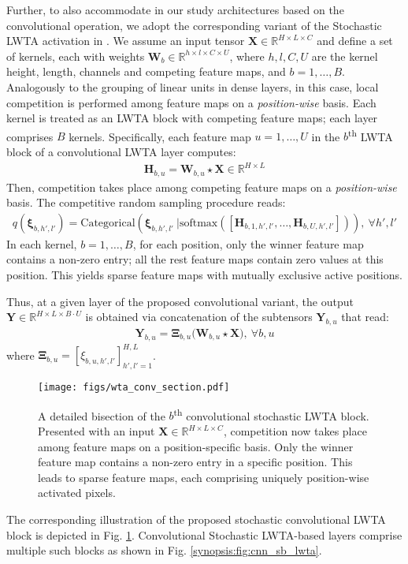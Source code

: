 \documentclass{article}
\begin{document}
	Further, to also accommodate in our study architectures based on the convolutional operation, we adopt the corresponding variant of the Stochastic LWTA activation in \cite{panousis2019nonparametric}.  We assume an input tensor $\boldsymbol{X} \in \mathbb{R}^{H\times L \times C}$ and define a set of kernels, each with weights  $\boldsymbol{W}_b\in \mathbb{R}^{h\times l \times C\times U}$, where $h, l, C, U$ are the kernel height, length, channels and competing feature maps, and $b=1, \dots, B$. Analogously to the grouping of linear units in dense layers, in this case, local competition is performed among feature maps on a \emph{position-wise} basis. Each kernel is treated as an LWTA block with competing feature maps; each layer comprises $B$ kernels. Specifically, each feature map $u=1, \dots, U$ in the $b$\textsuperscript{th} LWTA block of a convolutional LWTA layer computes:
\begin{align}
	   \boldsymbol H_{b,u} = \boldsymbol W_{b,u} \star \boldsymbol X \in \mathbb{R}^{H \times L} 
    \end{align}
Then, competition takes place among competing feature maps on a \textit{position-wise} basis. The competitive random sampling procedure reads:
\begin{align}
    	q(\boldsymbol\xi_{b,h',l'}) = \mathrm{Categorical}\left( \boldsymbol\xi_{b,h',l'} \ \Big|\mathrm{softmax}\left(\left[ \boldsymbol H_{b,1,h',l'}, \dots, \boldsymbol H_{b,U, h',l'} \right]\right)\right), \ \forall h',l'
    	\label{eqn:conv_q_xi}
    \end{align}
In each kernel, $b=1,\dots,B$, for each position, only the winner feature map contains a non-zero entry; all the rest feature maps contain zero values at this position. This yields sparse feature maps with mutually exclusive active positions. 
	
	Thus, at a given layer of the proposed convolutional variant, the output $\boldsymbol Y \in \mathbb{R}^{H \times L \times B \cdot U}$ is obtained via concatenation of the subtensors $\boldsymbol{Y}_{b,u}$ that read:
	\begin{align}
		\boldsymbol{Y}_{b,u} = \boldsymbol{\Xi}_{b,u} \Big( \boldsymbol{W}_{b, u}  \star \boldsymbol{X}\Big), \ \forall b,u
	\end{align}
	where $\boldsymbol{\Xi}_{b,u} = [\xi_{b,u,h',l'}]_{h',l'=1}^{H,L}$.
\begin{figure}
		\centering
		\texttt{[image: figs/wta\_conv\_section.pdf]}
		\caption{A detailed bisection of the $b$\textsuperscript{th} convolutional stochastic LWTA block. Presented with an input $\boldsymbol X \in \mathbb{R}^{H \times L \times C}$, competition now takes place among feature maps on a position-specific basis. Only the winner feature map contains a non-zero entry in a specific position. This leads to sparse feature maps, each comprising uniquely position-wise activated pixels.
		}
		\label{fig:block_conv}
	\end{figure}
The corresponding illustration of the proposed stochastic convolutional LWTA block is depicted in Fig. \ref{fig:block_conv}. Convolutional Stochastic LWTA-based layers comprise multiple such blocks as shown in Fig. \ref{synopsis:fig:cnn_sb_lwta}.
	
\end{document}
